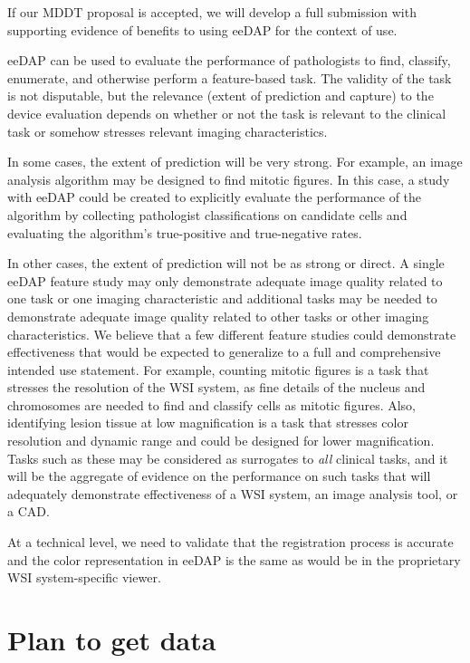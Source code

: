 \documentclass{article}%
\begin{document}
If our MDDT proposal is accepted, we will develop a full submission with
supporting evidence of benefits to using eeDAP for the context of use.

eeDAP can be used to evaluate the performance of pathologists to find,
classify, enumerate, and otherwise perform a feature-based task. The validity
of the task is not disputable, but the relevance (extent of prediction and
capture) to the device evaluation depends on whether or not the task is
relevant to the clinical task or somehow stresses relevant imaging characteristics.

In some cases, the extent of prediction will be very strong. For example, an
image analysis algorithm may be designed to find mitotic figures. In this
case, a study with eeDAP could be created to explicitly evaluate the
performance of the algorithm by collecting pathologist classifications on
candidate cells and evaluating the algorithm's true-positive and true-negative rates.

In other cases, the extent of prediction will not be as strong or direct. A
single eeDAP feature study may only demonstrate adequate image quality related
to one task or one imaging characteristic and additional tasks may be needed
to demonstrate adequate image quality related to other tasks or other imaging
characteristics. We believe that a few different feature studies could
demonstrate effectiveness that would be expected to generalize to a full and
comprehensive intended use statement. For example, counting mitotic figures is
a task that stresses the resolution of the WSI system, as fine details of the
nucleus and chromosomes are needed to find and classify cells as mitotic
figures. Also, identifying lesion tissue at low magnification is a task that
stresses color resolution and dynamic range and could be designed for lower
magnification. Tasks such as these may be considered as surrogates to
\emph{all} clinical tasks, and it will be the aggregate of evidence on the
performance on such tasks that will adequately demonstrate effectiveness of a
WSI system, an image analysis tool, or a CAD.

At a technical level, we need to validate that the registration process is
accurate and the color representation in eeDAP is the same as would be in the
proprietary WSI system-specific viewer.

\section{Plan to get data}
\end{document}
